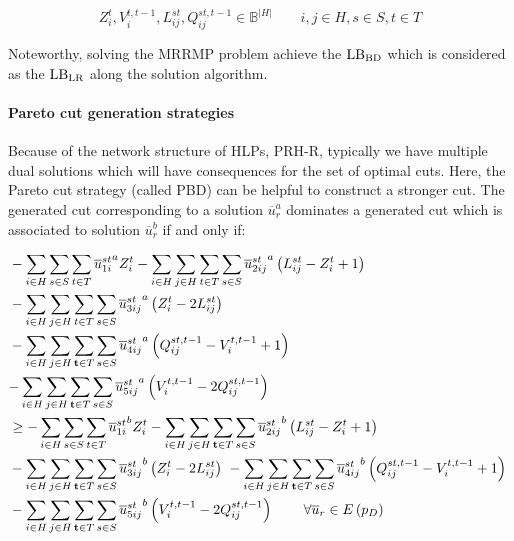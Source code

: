 \documentclass[review]{elsarticle}
\begin{document}
\[Z^t_i, V^{t,t-1}_i, L^{st}_{ij}, Q^{st,t-1}_{ij}\in {\mathbb{ B}}^{\left|H\right|}\qquad i,j\in H, s\in S, t\in T\]

Noteworthy, solving the MRRMP problem achieve the ${\rm LB_{BD}}$ which is considered as the ${\rm LB_{LR}}$ along the solution algorithm.

\paragraph{Pareto cut generation strategies}

Because of the network structure of HLPs, PRH-R, typically we have multiple dual solutions which will have consequences for the set of optimal cuts. Here, the Pareto cut strategy (called PBD) can be helpful to construct a stronger cut. The generated cut corresponding to a solution ${\overline{u}}^a_r$ dominates a generated cut which is associated to solution ${\overline{u}}^b_r$ if and only if:

\begin{align}\label{eq47}
&-\sum_{i\in H}\sum_{s\in S}\sum_{t\in T}{\overline{u}^{st}_{1i}}^aZ^t_i-\sum_{i\in H}\sum_{j\in H}\sum_{t\in T}\sum_{s\in S}{\overline{u}^{st}_{2ij}}^a\left(L^{st}_{ij}-Z^t_i+1\right)\cr
&-\sum_{i\in H}\sum_{j\in H}\sum_{t\in T}\sum_{s\in S}{\overline{u}^{st}_{3ij}}^a\left(Z^t_i-2L^{st}_{ij}\right)\cr
&-\sum_{i\in H}{\sum_{j\in H}{\sum_{\mathbf{ t}\in T}{\sum_{s\in S}{{{\overline{u}}^{st}_{4ij}}^a\left(Q^{st,t-1}_{ij}-V^{t,t-1}_i+1\right)\ }}}}\\
&\mathbf{ -}\sum_{i\in H}{\sum_{j\in H}{\sum_{\mathbf{ t}\in T}{\sum_{s\in S}{{{\overline{u}}^{st}_{5ij}}^a\left(V^{t,t-1}_i-2Q^{st,t-1}_{ij}\right)\ }}}}\nonumber\\
&\geq -\sum_{i\in H}{\sum_{s\in S}{\sum_{t\in T}{{{\overline{u}}^{st}_{1i}}^bZ^t_i}}}-\sum_{i\in H}{\sum_{j\in H}{\sum_{\mathbf{ t}\in T}{\sum_{s\in S}{{{\overline{u}}^{st}_{2ij}}^b\left(L^{st}_{ij}-Z^t_i+1\right)\ }}}}\nonumber\\
&-\sum_{i\in H}{\sum_{j\in H}{\sum_{\mathbf{ t}\in T}{\sum_{s\in S}{{{\overline{u}}^{st}_{3ij}}^b\left(Z^t_i-2L^{st}_{ij}\right)\ }}}}-\sum_{i\in H}{\sum_{j\in H}{\sum_{\mathbf{ t}\in T}{\sum_{s\in S}{{{\overline{u}}^{st}_{4ij}}^b\left(Q^{st,t-1}_{ij}-V^{t,t-1}_i+1\right)\ }}}}\nonumber\\
&-\sum_{i\in H}{\sum_{j\in H}{\sum_{\mathbf{ t}\in T}{\sum_{s\in S}{{{\overline{u}}^{st}_{5ij}}^b\left(V^{t,t-1}_i-2Q^{st,t-1}_{ij}\right)\ }}}}\qquad\forall {\overline{u}}_r\in E\left(p_D\right)\nonumber
\end{align}
\end{document}
